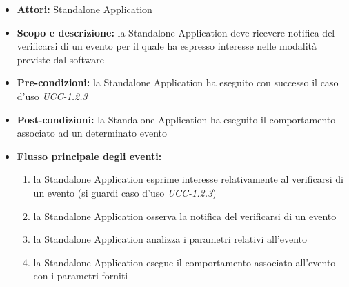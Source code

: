 \begin{itemize}
	\item \textbf{Attori:} Standalone Application
	\item \textbf{Scopo e descrizione:} la Standalone Application deve ricevere notifica del verificarsi di un evento per il quale ha espresso interesse nelle modalità previste dal software
	\item \textbf{Pre-condizioni:} la Standalone Application ha eseguito con successo il caso d'uso \emph{UCC-1.2.3}
	\item \textbf{Post-condizioni:} la Standalone Application ha eseguito il comportamento associato ad un determinato evento
	\item \textbf{Flusso principale degli eventi:}
		\begin{enumerate}
			\item la Standalone Application esprime interesse relativamente al verificarsi di un evento (si guardi caso d'uso \emph{UCC-1.2.3})
			\item la Standalone Application osserva la notifica del verificarsi di un evento
			\item la Standalone Application analizza i parametri relativi all'evento
			\item la Standalone Application esegue il comportamento associato all'evento con i parametri forniti
		\end{enumerate}
\end{itemize}





